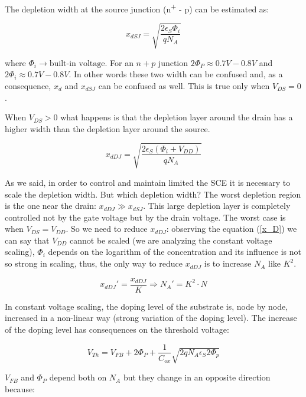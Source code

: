 \documentclass[a4paper, 12pt, twoside, openright]{report}
\newcommand{\super}{\textsuperscript}
\begin{document}
\begin{enumerate}
The depletion width at the source junction (n\super{+} - p) can be estimated as:

	\begin{equation}
	x_{dSJ} = \sqrt{\frac{2 \epsilon_S \Phi_i}{q N_A}} 
	\label{}
	\end{equation}

where $\Phi_i \rightarrow \text{built-in voltage}$.
For an $n+p$ junction $2 \Phi_P \approx 0.7 V - 0.8 V$ and $2 \Phi_i \approx 0.7 V - 0.8 V$. In other words these two width can be confused and, as a consequence, $x_{d}$ and $x_{dSJ}$ can be confused as well. This is true only when $V_{DS} = 0$.

When $V_{DS} > 0$ what happens is that the depletion layer around the drain has a higher width than the depletion layer around the source.

	\begin{equation}
	x_{dDJ} = \sqrt{\frac{2 \epsilon_S (\Phi_i + V_{DD})}{q N_A}}
	\label{x_D}
	\end{equation}

As we said, in order to control and maintain limited the SCE it is necessary to scale the depletion width. But which depletion width? The worst depletion region is the one near the drain: $x_{dDJ} \gg x_{dSJ}$. This large depletion layer is completely controlled not by the gate voltage but by the drain voltage. The worst case is when  $V_{DS} = V_{DD}$. So we need to reduce $x_{dDJ}$: observing the equation (\ref{x_D}) we can say that $V_{DD}$ cannot be scaled (we are analyzing the constant voltage scaling), $\Phi_i$ depends on the logarithm of the concentration and its influence is not so strong in scaling, thus, the only way to reduce $x_{dDJ}$ is to increase $N_{A}$ like $K^{2}$.

	\begin{equation}
	x_{dDJ}' = \frac{x_{dDJ}}{K} \Rightarrow N_A' = K^2 \cdot N
	\label{x_D}
	\end{equation}

In constant voltage scaling, the doping level of the substrate is, node by node, increased in a non-linear way (strong variation of the doping level). The increase of the doping level has consequences on the threshold voltage:

	\begin{equation}
	V_{Th} = V_{FB}+2\Phi_P+\frac{1}{C_{ox}}\sqrt{2qN_A\epsilon_S 2\Phi_p}
	\end{equation}

$V_{FB}$ and $\Phi_P$ depend both on $N_{A}$ but they change in an opposite direction because: 


\end{enumerate}
\end{document}
